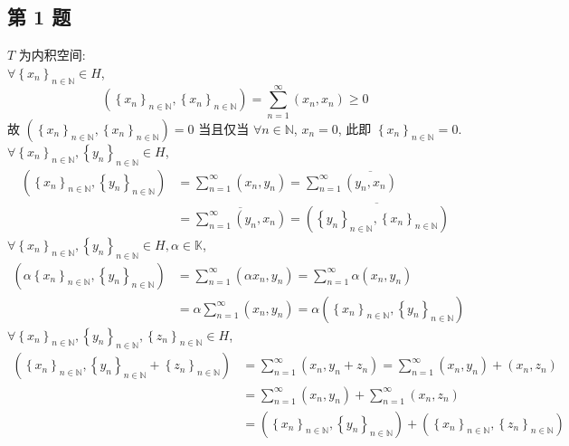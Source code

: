 \documentclass[\ROOT/main.tex]{subfiles}
\begin{document}
\subsection{第 1 题}
$T$ 为内积空间: \\
$\forall \left\{ x_n \right\}_{n \in \mathbb{N}} \in H$,
\[
    \left( \left\{ x_n \right\}_{n \in \mathbb{N}}, \left\{ x_n \right\}_{n \in \mathbb{N}} \right)
    = \sum_{n = 1}^{\infty} \left( x_n , x_n \right)
    \geqslant 0
\]
故 $\left( \left\{ x_n \right\}_{n \in \mathbb{N}}, \left\{ x_n \right\}_{n \in \mathbb{N}} \right) = 0$
当且仅当 $\forall n \in \mathbb{N}$, $x_n = 0$, 此即 $\left\{ x_n \right\}_{n \in \mathbb{N}} = 0$. \\
$\forall \left\{ x_n \right\}_{n \in \mathbb{N}}, \left\{ y_n \right\}_{n \in \mathbb{N}} \in H$,
\begin{align*}
    \left( \left\{ x_n \right\}_{n \in \mathbb{N}}, \left\{ y_n \right\}_{n \in \mathbb{N}} \right)
    &= \sum_{n = 1}^{\infty} \left( x_n, y_n \right)
    = \sum_{n = 1}^{\infty} \overline{\left( y_n, x_n \right)} \\
    &= \overline{\sum_{n = 1}^{\infty} \left( y_n, x_n \right)}
    = \overline{\left( \left\{ y_n \right\}_{n \in \mathbb{N}}, \left\{ x_n \right\}_{n \in \mathbb{N}} \right)}
\end{align*}
$\forall \left\{ x_n \right\}_{n \in \mathbb{N}}, \left\{ y_n \right\}_{n \in \mathbb{N}}\in H, \alpha \in \mathbb{K}$,
\begin{align*}
    \left( \alpha \left\{ x_n \right\}_{n \in \mathbb{N}}, \left\{ y_n \right\}_{n \in \mathbb{N}}\right)
    &= \sum_{n = 1}^{\infty} \left( \alpha x_n, y_n \right)
    = \sum_{n = 1}^{\infty} \alpha \left( x_n, y_n \right) \\
    &= \alpha \sum_{n = 1}^{\infty} \left( x_n , y_n \right)
    = \alpha \left( \left\{ x_n \right\}_{n \in \mathbb{N}}, \left\{ y_n \right\}_{n \in \mathbb{N}} \right)
\end{align*}
$\forall \left\{ x_n \right\}_{n \in \mathbb{N}}, \left\{ y_n \right\}_{n \in \mathbb{N}}, \left\{ z_n \right\}_{n \in \mathbb{N}} \in H$,
\begin{align*}
    \left( \left\{ x_n \right\}_{n \in \mathbb{N}}, \left\{ y_n \right\}_{n \in \mathbb{N}} + \left\{ z_n \right\}_{n \in \mathbb{N}} \right)
    &= \sum_{n = 1}^{\infty} \left( x_n, y_n + z_n \right)
    = \sum_{n = 1}^{\infty} \left( x_n, y_n \right) + \left( x_n , z_n \right) \\
    &= \sum_{n = 1}^{\infty} \left( x_n, y_n \right) + \sum_{n = 1}^{\infty} \left( x_n, z_n \right) \\
    &= \left( \left\{ x_n \right\}_{n \in \mathbb{N}}, \left\{ y_n \right\}_{n \in \mathbb{N}} \right) + \left( \left\{ x_n \right\}_{n \in \mathbb{N}}, \left\{ z_n \right\}_{n \in \mathbb{N}} \right)
\end{align*}
\end{document}
